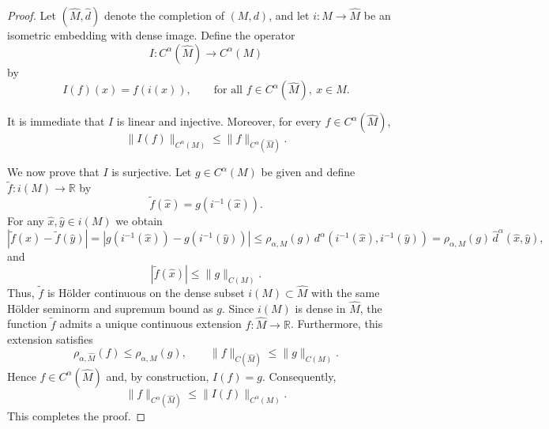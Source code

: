 \documentclass[10pt,a4paper]{amsart}
\begin{document}
\begin{proof}
Let $(\widehat{M},\widehat{d})$ denote the completion of $(M,d)$, and let 
$i: M \to \widehat{M}$ be an isometric embedding with dense image. 
Define the operator
\[
I: C^{\alpha}(\widehat{M}) \to C^{\alpha}(M)
\]
by
\[
I(f)(x) = f(i(x)), \qquad \text{for all } f \in C^{\alpha}(\widehat{M}),\ x \in M.
\]

It is immediate that $I$ is linear and injective. Moreover, for every 
$f \in C^{\alpha}(\widehat{M})$,
\[
\|I(f)\|_{C^{\alpha}(M)} \le \|f\|_{C^{\alpha}(\widehat{M})}.
\]

We now prove that $I$ is surjective. Let $g \in C^{\alpha}(M)$ be given and define 
$\widetilde{f}: i(M) \to \mathbb{R}$ by
\[
\widetilde{f}(\hat{x}) = g(i^{-1}(\hat{x})).
\]
For any $\hat{x}, \hat{y} \in i(M)$ we obtain
\[
|\widetilde{f}(\hat{x}) - \widetilde{f}(\hat{y})|
= |g(i^{-1}(\hat{x})) - g(i^{-1}(\hat{y}))|
\le \rho_{\alpha,M}(g)\,d^{\alpha}(i^{-1}(\hat{x}),i^{-1}(\hat{y}))
=\rho_{\alpha,M}(g)\,\widehat{d} ^{\alpha}(\hat{x},\hat{y}),
\]
and
\[
|\widetilde{f}(\hat{x})| \le \|g\|_{C(M)}.
\]
Thus, $\widetilde{f}$ is Hölder continuous on the dense subset 
$i(M) \subset \widehat{M}$ with the same Hölder seminorm and supremum bound as $g$.
Since $i(M)$ is dense in $\widehat{M}$, the function $\widetilde{f}$ admits 
a unique continuous extension $f: \widehat{M} \to \mathbb{R}$. 
Furthermore, this extension satisfies
\[
\rho_{\alpha,\widehat{M}}(f) \le \rho_{\alpha,M}(g),
\qquad
\|f\|_{C(\widehat{M})} \le \|g\|_{C(M)}.
\]
Hence $f \in C^{\alpha}(\widehat{M})$ and, by construction, $I(f)=g$. 
Consequently,
\[
\|f\|_{C^{\alpha}(\widehat{M})}
\le
\|I(f)\|_{C^{\alpha}(M)}.
\]
This completes the proof.
\end{proof}
\end{document}
